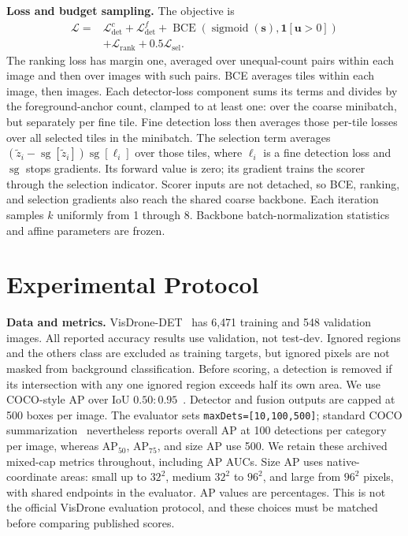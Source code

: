 \documentclass[conference]{IEEEtran}
\begin{document}
\textbf{Loss and budget sampling.} The objective is
\begin{align}
\mathcal L={}&\mathcal L^c_{\mathrm{det}}+\mathcal L^f_{\mathrm{det}}
+\operatorname{BCE}(\operatorname{sigmoid}(\mathbf s),\mathbf1[\mathbf u>0])\nonumber\\
&+\mathcal L_{\mathrm{rank}}+0.5\mathcal L_{\mathrm{sel}}.
\end{align}
The ranking loss has margin one, averaged over unequal-count pairs within each image and then over images with such pairs. BCE averages tiles within each image, then images. Each detector-loss component sums its terms and divides by the foreground-anchor count, clamped to at least one: over the coarse minibatch, but separately per fine tile. Fine detection loss then averages those per-tile losses over all selected tiles in the minibatch. The selection term averages $(\tilde z_i-\operatorname{sg}[\tilde z_i])\operatorname{sg}[\ell_i]$ over those tiles, where $\ell_i$ is a fine detection loss and $\operatorname{sg}$ stops gradients. Its forward value is zero; its gradient trains the scorer through the selection indicator. Scorer inputs are not detached, so BCE, ranking, and selection gradients also reach the shared coarse backbone. Each iteration samples $k$ uniformly from 1 through 8. Backbone batch-normalization statistics and affine parameters are frozen.

\section{Experimental Protocol}
\label{sec:protocol}
\textbf{Data and metrics.} VisDrone-DET~\cite{zhu2022visdrone} has 6{,}471 training and 548 validation images. All reported accuracy results use validation, not test-dev. Ignored regions and the others class are excluded as training targets, but ignored pixels are not masked from background classification. Before scoring, a detection is removed if its intersection with any one ignored region exceeds half its own area. We use COCO-style AP over IoU $0.50{:}0.95$~\cite{lin2014coco}. Detector and fusion outputs are capped at 500 boxes per image. The evaluator sets \texttt{maxDets=[10,100,500]}; standard COCO summarization~\cite{cocoapi} nevertheless reports overall AP at 100 detections per category per image, whereas AP$_{50}$, AP$_{75}$, and size AP use 500. We retain these archived mixed-cap metrics throughout, including AP AUCs. Size AP uses native-coordinate areas: small up to $32^2$, medium $32^2$ to $96^2$, and large from $96^2$ pixels, with shared endpoints in the evaluator. AP values are percentages. This is not the official VisDrone evaluation protocol, and these choices must be matched before comparing published scores.
\end{document}
